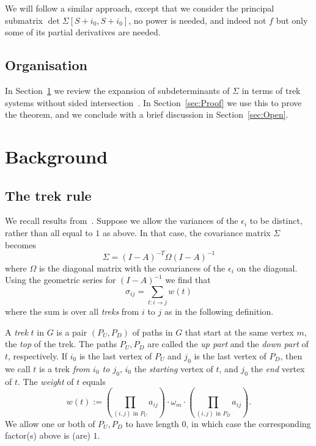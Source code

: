 \documentclass[ALCO,ThmDefs,Unicode]{cedram}
\begin{document}
We will follow a similar approach, except that we consider the principal submatrix $\det \Sigma[S+i_0,S+i_0]$, no power is needed, and indeed not $f$ but only some of its partial derivatives are needed.

\subsection*{Organisation}

In Section~\ref{sec:Background} we review the expansion of subdeterminants of $\Sigma$ in terms of trek systems without sided intersection~\cite{Draisma09d}. In Section~\ref{sec:Proof} we use this to prove the theorem, and we conclude with a brief discussion in Section~\ref{sec:Open}.

\section{Background} \label{sec:Background}

\subsection*{The trek rule}

We recall results from~\cite{Draisma09d}. Suppose we allow the variances of the $\epsilon_i$ to be distinct, rather than all equal to $1$ as above. In that case, the covariance matrix $\Sigma$ becomes
\[
\Sigma=(I-A)^{-T} \Omega (I-A)^{-1}
\]
where $\Omega$ is the diagonal matrix with the covariances of the $\epsilon_i$ on the diagonal. Using the geometric series for $(I-A)^{-1}$ we find that
\[
\sigma_{ij}=\sum_{t:i \to j} w(t)
\]
where the sum is over all \emph{treks} from $i$ to $j$ as in the following definition.

\begin{defi}
A \emph{trek} $t$ in $G$ is a pair $(P_U,P_D)$ of paths in $G$ that start at the same vertex $m$, the \emph{top} of the trek. The paths $P_U,P_D$ are called the \emph{up part} and the \emph{down part} of $t$, respectively. If $i_0$ is the last vertex of $P_U$ and $j_0$ is the last vertex of $P_D$, then we call $t$ is a trek \emph{from $i_0$ to $j_0$}, $i_0$ the \emph{starting} vertex of $t$, and $j_0$ the \emph{end} vertex of $t$. The \emph{weight} of $t$ equals
\[
w(t):= \left(\prod_{(i,j) \text{ in } P_U} a_{ij} \right) \cdot \omega_m \cdot
\left(\prod_{(i,j) \text{ in } P_D} a_{ij} \right).
\]
We allow one or both of $P_U,P_D$ to have length $0$, in which case the corresponding factor(s) above is (are) $1$.
\end{defi}
\end{document}

